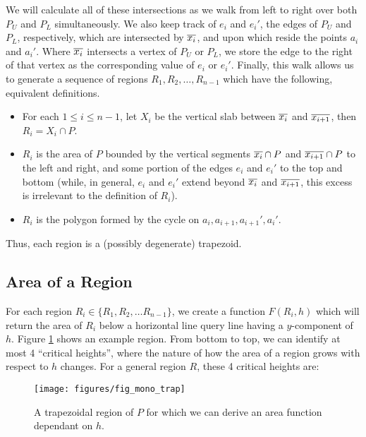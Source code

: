 We will calculate all of these intersections as we walk from left to right over both $P_U$ and $P_L$ simultaneously. 
We also keep track of $e_i$ and $e_i'$, the edges of $P_U$ and $P_L$, respectively, which are intersected by $\overline{x_i}$, and upon which reside the points $a_i$ and $a_i'$. 
Where $\overline{x_i}$ intersects a vertex of $P_U$ or $P_L$, we store the edge to the right of that vertex as the corresponding value of $e_i$ or $e_i'$.
Finally, this walk allows us to generate a sequence of regions $R_1, R_2, \dots, R_{n-1}$ which have the following, equivalent definitions.
\begin{itemize}
 \item For each $1 \leq i \leq n - 1$, let $X_i$ be the vertical slab between $\overline{x_i}$ and $\overline{x_{i+1}}$, then $R_i = X_i \cap P$.

 \item $R_i$ is the area of $P$ bounded by the vertical segments $\overline{x_i} \cap P$ and $\overline{x_{i+1}} \cap P$ to the left and right, and some portion of the edges $e_i$ and $e_i'$ to the top and bottom (while, in general, $e_i$ and  $e_i'$ extend beyond $\overline{x_i}$ and $\overline{x_{i+1}}$, this excess is irrelevant to the definition of $R_i$).
 
 \item $R_i$ is the polygon formed by the cycle on $a_i, a_{i+1}, a_{i+1}', a_i'$.
\end{itemize}

\noindent
Thus, each region is a (possibly degenerate) trapezoid.


\subsection{Area of a Region}
\label{sec:region_area}

For each region $R_i \in \{R_1, R_2, \ldots R_{n-1}\}$, we create a function $F(R_i, h)$ which will return the area of $R_i$ below a horizontal line query line having a $y$-component of $h$.
Figure \ref{fig:monotonep:trapezoid} shows an example region.
From bottom to top, we can identify at most 4 ``critical heights'', where the nature of how the area of a region grows with respect to $h$ changes.
For a general region $R$, these 4 critical heights are:

\begin{figure}[t]
\begin{center}
  \texttt{[image: figures/fig\_mono\_trap]}
  \caption[A trapezoidal region of $P$.]{A trapezoidal region of $P$ for which we can derive an area function dependant on $h$.}
  \label{fig:monotonep:trapezoid}
\end{center}
\end{figure}

